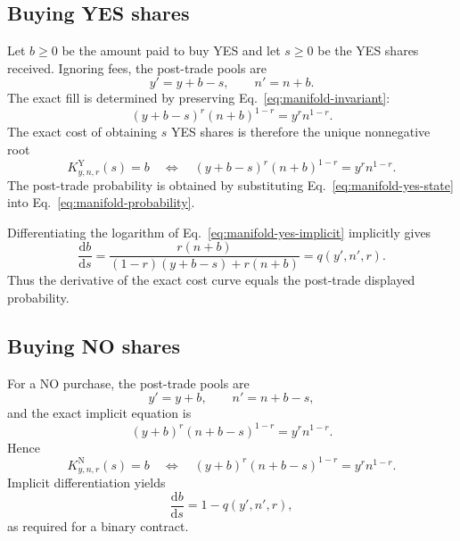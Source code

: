 \documentclass[journal, a4paper]{IEEEtran}
\begin{document}
\subsection{Buying YES shares}
Let $b\geq0$ be the amount paid to buy YES and let $s\geq0$ be the YES shares received. Ignoring fees, the post-trade pools are
\begin{equation}
y'=y+b-s,
\qquad
n'=n+b.
\label{eq:manifold-yes-state}
\end{equation}
The exact fill is determined by preserving Eq.~\eqref{eq:manifold-invariant}:
\begin{equation}
(y+b-s)^r(n+b)^{1-r}=y^r n^{1-r}.
\label{eq:manifold-yes-implicit}
\end{equation}
The exact cost of obtaining $s$ YES shares is therefore the unique nonnegative root
\begin{equation}
K_{y,n,r}^{\mathrm{Y}}(s)=b
\quad\Longleftrightarrow\quad
(y+b-s)^r(n+b)^{1-r}=y^r n^{1-r}.
\label{eq:manifold-yes-cost}
\end{equation}
The post-trade probability is obtained by substituting Eq.~\eqref{eq:manifold-yes-state} into Eq.~\eqref{eq:manifold-probability}.

Differentiating the logarithm of Eq.~\eqref{eq:manifold-yes-implicit} implicitly gives
\begin{equation}
\frac{\mathrm{d}b}{\mathrm{d}s}
=
\frac{r(n+b)}{(1-r)(y+b-s)+r(n+b)}
=
q(y',n',r).
\label{eq:manifold-yes-marginal}
\end{equation}
Thus the derivative of the exact cost curve equals the post-trade displayed probability.

\subsection{Buying NO shares}
For a NO purchase, the post-trade pools are
\begin{equation}
y'=y+b,
\qquad
n'=n+b-s,
\end{equation}
and the exact implicit equation is
\begin{equation}
(y+b)^r(n+b-s)^{1-r}=y^r n^{1-r}.
\label{eq:manifold-no-implicit}
\end{equation}
Hence
\begin{equation}
K_{y,n,r}^{\mathrm{N}}(s)=b
\quad\Longleftrightarrow\quad
(y+b)^r(n+b-s)^{1-r}=y^r n^{1-r}.
\end{equation}
Implicit differentiation yields
\begin{equation}
\frac{\mathrm{d}b}{\mathrm{d}s}
=
1-q(y',n',r),
\end{equation}
as required for a binary contract.
\end{document}
